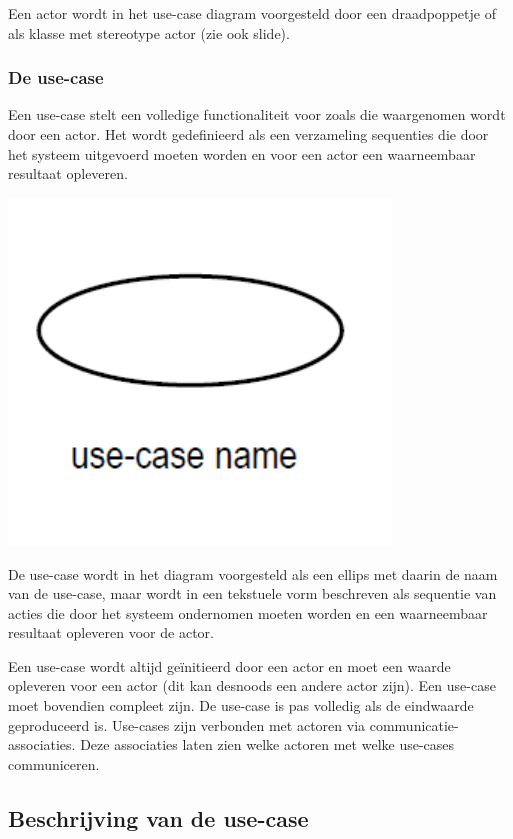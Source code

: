 Een actor wordt in het use-case diagram voorgesteld door een draadpoppetje of als klasse met stereotype actor (zie ook slide).
\newpage
\subsubsection{De use-case}

Een use-case stelt een volledige functionaliteit voor zoals die waargenomen wordt door een actor. Het wordt gedefinieerd als een verzameling sequenties die door het systeem uitgevoerd moeten worden en voor een actor een waarneembaar resultaat opleveren.


\begin{center}
\includegraphics[width=4in]{img/usecase1}%
\end{center}

De use-case wordt in het diagram voorgesteld als een ellips met daarin de naam van de use-case, maar wordt in een tekstuele vorm beschreven als sequentie van acties die door het systeem ondernomen moeten worden en een waarneembaar resultaat opleveren voor de actor.

Een use-case wordt altijd geïnitieerd door een actor en moet een waarde opleveren voor een actor (dit kan desnoods een andere actor zijn). Een use-case moet bovendien compleet zijn. De use-case is pas volledig als de eindwaarde geproduceerd is.
Use-cases zijn verbonden met actoren via communicatie-associaties. Deze associaties laten zien welke actoren met welke use-cases communiceren.
\newpage
\subsection{Beschrijving van de use-case}

